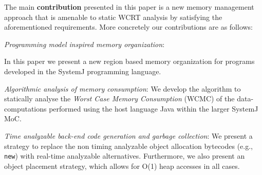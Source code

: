 
The main \textbf{contribution} presented in this paper is a new memory
management approach that is amenable to static WCRT analysis by
satisfying the aforementioned requirements. More concretely our
contributions are as follows:

\begin{itemize}
\item \textit{Programming model inspired memory organization}:
  {\color{red} In this paper we present a new region based memory
    organization for programs developed in the SystemJ programming
    language. %
    
  \item \textit{Algorithmic analysis of memory consumption}: We develop
    the algorithm to statically analyse the \textit{Worst Case Memory
      Consumption} (WCMC) of the data-computations performed using the
    host language Java within the larger SystemJ MoC.

  }
\item \textit{Time analyzable back-end code generation and garbage
    collection}: We present a strategy to replace the non timing
  analyzable object allocation bytecodes (e.g., \texttt{new}) with
  real-time analyzable alternatives. Furthermore, we also present an
  object placement strategy, which allows for O(1) heap accesses in all
  cases.
\end{itemize}

